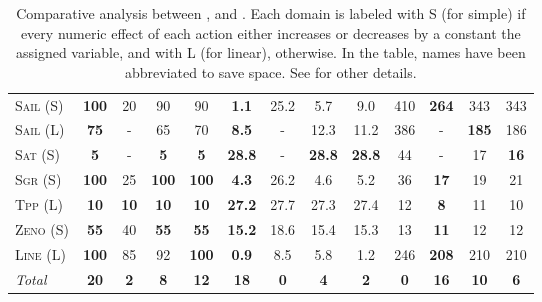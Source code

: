 \documentclass[11pt]{article}
\begin{document}
\begin{table*}[tb]
{\begin{tabular}{|l||cccc||cccc||cccc||}
\textsc{Sail} (S)&\textbf{100}&20&90&90&\textbf{1.1}&25.2&5.7&9.0&410&\textbf{264}&343&343\\
\textsc{Sail} (L)&\textbf{75}&-&65&70&\textbf{8.5}&-&12.3&11.2&386&-&\textbf{185}&186\\
\textsc{Sat} (S)&\textbf{5}&-&\textbf{5}&\textbf{5}&\textbf{28.8}&-&\textbf{28.8}&\textbf{28.8}&44&-&17&\textbf{16}\\
\textsc{Sgr} (S)&\textbf{100}&25&\textbf{100}&\textbf{100}&\textbf{4.3}&26.2&4.6&5.2&36&\textbf{17}&19&21\\
\textsc{Tpp} (L)&\textbf{10}&\textbf{10}&\textbf{10}&\textbf{10}&\textbf{27.2}&27.7&27.3&27.4&12&\textbf{8}&11&10\\
\textsc{Zeno} (S)&\textbf{55}&40&\textbf{55}&\textbf{55}&\textbf{15.2}&18.6&15.4&15.3&13&\textbf{11}&12&12\\
\textsc{Line} (L)&\textbf{100}&85&92&\textbf{100}&\textbf{0.9}&8.5&5.8&1.2&246&\textbf{208}&210&210
\\\hline
\textit{Total}&\textbf{20}&\textbf{2}&\textbf{8}&\textbf{12}&\textbf{18}&\textbf{0}&\textbf{4}&\textbf{2}&\textbf{0}&\textbf{16}&\textbf{10}&\textbf{6}\\\hline

        \end{tabular}}
        \caption{Comparative analysis between  \pattye, \pattym and \pattyi. Each domain is labeled with S (for simple) if every numeric effect of each action either increases or decreases by a constant the assigned variable, and with L (for linear), otherwise. In the table, names have been abbreviated to save space.  See \cite{ipc2023} for other details.}
        \label{tab:qual-plans}
        \end{table*}
        
\end{document}
